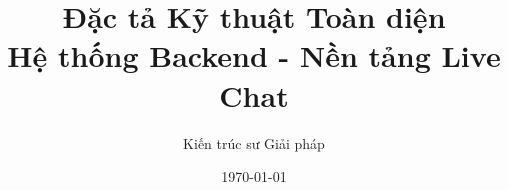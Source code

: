 \usepackage[utf8]{inputenc}
\usepackage[T5]{fontenc}
\usepackage[vietnamese]{babel}
\usepackage[a4paper, top=2.5cm, bottom=2.5cm, left=2.5cm, right=2.5cm, marginparwidth=1.75cm]{geometry}
\usepackage{amsmath}
\usepackage{graphicx}
\usepackage{hyperref}
\usepackage[inkscapelatex=false]{svg}
\usepackage{minted}
\usepackage{xurl}

\let\oldtexttt\texttt
\renewcommand{\texttt}[1]{\url{#1}}

\hypersetup{
    colorlinks=true,
    linkcolor=blue,
    filecolor=magenta,      
    urlcolor=cyan,
}

\usepackage{titlesec}
\titleformat{\section}{\normalfont\Large\bfseries}{\thesection}{1em}{}
\titleformat{\subsection}{\normalfont\large\bfseries}{\thesubsection}{1em}{}

\title{\textbf{Đặc tả Kỹ thuật Toàn diện \\ Hệ thống Backend - Nền tảng Live Chat}}
\author{Kiến trúc sư Giải pháp}
\date{\today}